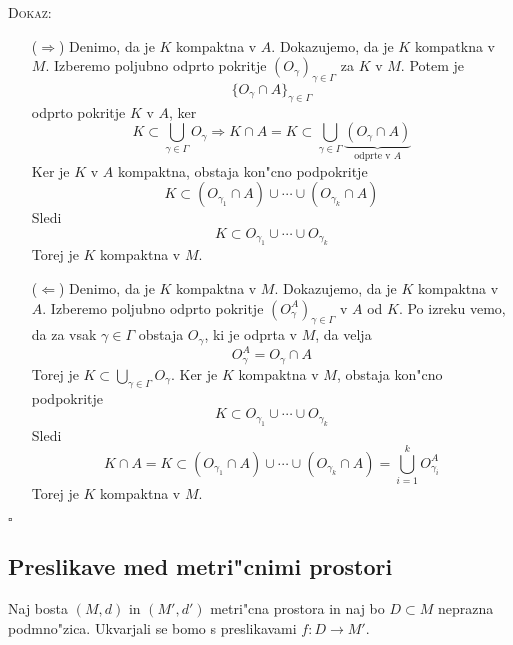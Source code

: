 \textsc{Dokaz:}
\begin{itemize}
    \item[($\Rightarrow$)] Denimo, da je $K$ kompaktna v $A$. Dokazujemo, da je $K$ kompatkna v $M$. Izberemo poljubno odprto pokritje $(O_\gamma)_{\gamma \in \Gamma}$ za $K$ v $M$. Potem je
    \begin{equation*}
    \{ O_\gamma \cap A \}_{\gamma \in \Gamma}
    \end{equation*}
    odprto pokritje $K$ v $A$, ker
    \begin{equation*}
    K \subset \bigcup_{\gamma \in \Gamma} O_\gamma \Rightarrow K \cap A = K \subset \bigcup_{\gamma \in \Gamma} \underbrace{\left( O_\gamma \cap A \right)}_\text{odprte v $A$}
    \end{equation*}
    Ker je $K$ v $A$ kompaktna, obstaja kon"cno podpokritje
    \begin{equation*}
    K \subset (O_{\gamma_1} \cap A) \cup \cdots \cup (O_{\gamma_k} \cap A)
    \end{equation*}
    Sledi
    \begin{equation*}
    K \subset O_{\gamma_1} \cup \cdots \cup O_{\gamma_k}
    \end{equation*}
    Torej je $K$ kompaktna v $M$.
    
    \item[($\Leftarrow$)] Denimo, da je $K$ kompaktna v $M$. Dokazujemo, da je $K$ kompaktna v $A$. Izberemo poljubno odprto pokritje $(O_\gamma^A)_{\gamma \in \Gamma}$ v $A$ od $K$. Po izreku vemo, da za vsak $\gamma \in \Gamma$ obstaja $O_\gamma$, ki je odprta v $M$, da velja
    \begin{equation*}
    O_\gamma^A = O_\gamma \cap A
    \end{equation*}
    Torej je $K \subset \bigcup_{\gamma \in \Gamma} O_\gamma$. Ker je $K$ kompaktna v $M$, obstaja kon"cno podpokritje
    \begin{equation*}
    K \subset O_{\gamma_1} \cup \cdots \cup O_{\gamma_k}
    \end{equation*}
    Sledi
    \begin{equation*}
    K \cap A = K \subset (O_{\gamma_1} \cap A) \cup \cdots \cup (O_{\gamma_k} \cap A) = \bigcup_{i=1}^k O_{\gamma_i}^A
    \end{equation*}
    Torej je $K$ kompaktna v $M$.
\end{itemize}
\hfill $\square$

\subsection{Preslikave med metri"cnimi prostori}
Naj bosta $(M, d)$ in $(M', d')$ metri"cna prostora in naj bo $D \subset M$ neprazna podmno"zica. Ukvarjali se bomo s preslikavami $f: D \to M'$.

